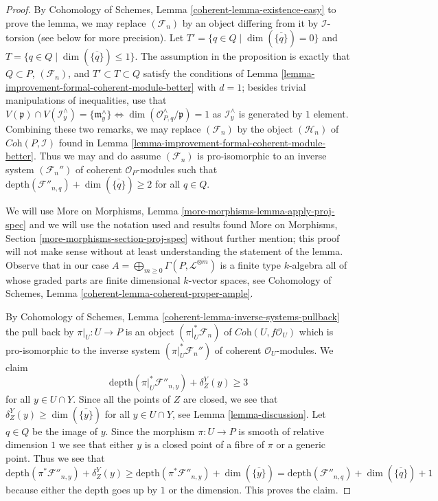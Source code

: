 \documentclass[10pt,a4paper]{amsart}
\theoremstyle{plain}
\theoremstyle{definition}
\theoremstyle{remark}
\numberwithin{equation}{subsection}
\begin{document}
\begin{proof}
By Cohomology of Schemes, Lemma \ref{coherent-lemma-existence-easy}
to prove the lemma, we may replace $(\mathcal{F}_n)$ by an object
differing from it by $\mathcal{I}$-torsion (see below for more precision).
Let $T' = \{q \in Q \mid \dim(\overline{\{q\}}) = 0\}$
and $T = \{q \in Q \mid \dim(\overline{\{q\}}) \leq 1\}$.
The assumption in the proposition is exactly that
$Q \subset P$, $(\mathcal{F}_n)$, and $T' \subset T \subset Q$
satisfy the conditions of
Lemma \ref{lemma-improvement-formal-coherent-module-better}
with $d = 1$; besides trivial manipulations of inequalities, use that
$V(\mathfrak p) \cap V(\mathcal{I}^\wedge_y) = \{\mathfrak m^\wedge_y\}
\Leftrightarrow \dim(\mathcal{O}_{P, q}^\wedge/\mathfrak p) = 1$
as $\mathcal{I}_y^\wedge$ is generated by $1$ element.
Combining these two remarks, we may replace $(\mathcal{F}_n)$ by the
object $(\mathcal{H}_n)$ of $\textit{Coh}(P, \mathcal{I})$ found in
Lemma \ref{lemma-improvement-formal-coherent-module-better}.
Thus we may and do assume $(\mathcal{F}_n)$ is pro-isomorphic to
an inverse system $(\mathcal{F}_n'')$ of coherent $\mathcal{O}_P$-modules
such that $\text{depth}(\mathcal{F}''_{n, q}) + \dim(\overline{\{q\}}) \geq 2$
for all $q \in Q$.

\medskip\noindent
We will use More on Morphisms, Lemma \ref{more-morphisms-lemma-apply-proj-spec}
and we will use the notation used and results found
More on Morphisms, Section \ref{more-morphisms-section-proj-spec}
without further mention; this proof will not make sense without
at least understanding the statement of the lemma.
Observe that in our case
$A = \bigoplus_{m \geq 0} \Gamma(P, \mathcal{L}^{\otimes m})$
is a finite type $k$-algebra
all of whose graded parts are finite dimensional $k$-vector spaces, see
Cohomology of Schemes, Lemma \ref{coherent-lemma-coherent-proper-ample}.

\medskip\noindent
By Cohomology of Schemes, Lemma \ref{coherent-lemma-inverse-systems-pullback}
the pull back by $\pi|_U : U \to P$ is an object
$(\pi|_U^*\mathcal{F}_n)$ of $\textit{Coh}(U, f\mathcal{O}_U)$
which is pro-isomorphic to the inverse system
$(\pi|_U^*\mathcal{F}_n'')$ of coherent $\mathcal{O}_U$-modules.
We claim
$$
\text{depth}(\pi|_U^*\mathcal{F}''_{n, y}) + \delta_Z^Y(y) \geq 3
$$
for all $y \in U \cap Y$. Since all the points of $Z$ are closed, we
see that $\delta_Z^Y(y) \geq \dim(\overline{\{y\}})$ for all
$y \in U \cap Y$, see Lemma \ref{lemma-discussion}.
Let $q \in Q$ be the image of $y$. Since the morphism $\pi : U \to P$ is
smooth of relative dimension $1$ we see that either $y$ is a closed point
of a fibre of $\pi$ or a generic point.
Thus we see that
$$
\text{depth}(\pi^*\mathcal{F}''_{n, y}) + \delta_Z^Y(y)
\geq
\text{depth}(\pi^*\mathcal{F}''_{n, y}) + \dim(\overline{\{y\}}) =
\text{depth}(\mathcal{F}''_{n, q}) + \dim(\overline{\{q\}}) + 1
$$
because either the depth goes up by $1$ or the dimension.
This proves the claim.


\end{proof}
\end{document}
